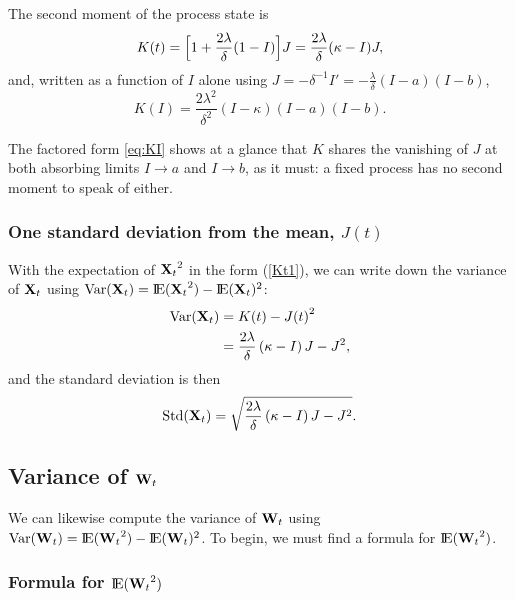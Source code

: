 \begin{theorem}
\label{thm:K}
The second moment of the process state is
\begin{equation}
\label{eq:Kclosedform}
K(t)=\Bigl[1+\frac{2\lambda}{\delta}(1-I)\Bigr]J
=\frac{2\lambda}{\delta}(\kappa-I)J,
\end{equation}
and, written as a function of $I$ alone using
$J=-\delta^{-1}I'=-\frac{\lambda}{\delta}(I-a)(I-b)$,
\begin{equation}
\label{eq:KI}
K(I) = \frac{2\lambda^2}{\delta^2}(I-\kappa)(I-a)(I-b).
\end{equation}
\end{theorem}

The factored form \eqref{eq:KI} shows at a glance that $K$ shares the
vanishing of $J$ at both absorbing limits $I\to a$ and $I\to b$, as it must:
a fixed process has no second moment to speak of either.

\subsubsection{One standard deviation from the mean, $J(t)$}

With the expectation of ${{\bf X}_t}^2$ in the form (\ref{Kt1}), we can write down the
variance of ${{\bf X}_t}$ using $\text{Var}({{\bf X}_t}) = {\rm I}\!{\rm E}({{\bf X}_t}^2) - {\rm I}\!{\rm E}({{\bf X}_t})^2$:
\begin{align*}
\text{Var}({{\bf X}_t}) &= K(t) - {J(t)}^2\\
&= \frac{2\lambda}{\delta}\left(\kappa - I\right) J - J^2,
\end{align*}
and the standard deviation is then
\begin{equation*}
\text{Std}({{\bf X}_t}) = \sqrt{\frac{2\lambda}{\delta}\left(\kappa- I\right) J - J^2}.
\end{equation*}

\subsection{Variance of ${{\bf W}_t}$}

We can likewise compute the variance of ${{\bf W}_t}$ using
$\text{Var}({{\bf W}_t}) = {\rm I}\!{\rm E}({{\bf W}_t}^2) - {\rm I}\!{\rm E}({{\bf W}_t})^2$. To begin, we must find a
formula for ${\rm I}\!{\rm E}({{\bf W}_t}^2)$.

\subsubsection{Formula for ${\rm I}\!{\rm E}({{\bf W}_t}^2)$}

